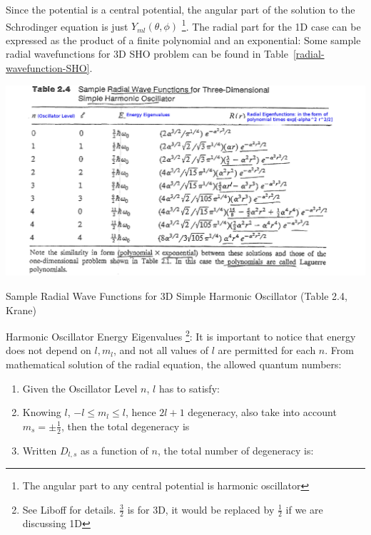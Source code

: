 \documentclass{school-22.101-notes}
\begin{document}
Since the potential is a central potential, the angular part of the solution to the Schrodinger equation is just $Y_{ml} (\theta, \phi)$ \footnote{The angular part to any central potential is harmonic oscillator}. The radial part for the 1D case can be expressed as the product of a finite polynomial and an exponential: 
Some sample radial wavefunctions for 3D SHO problem can be found in Table~\ref{radial-wavefunction-SHO}. 

\begin{table}[h!]
    \centering
    \includegraphics[width=6in]{images/shell/radial-wavefunction-SHO.png}
    \caption{Sample Radial Wave Functions for 3D Simple Harmonic Oscillator (Table 2.4, Krane)}
    \label{radial-wavefunction-SHO}
\end{table}

Harmonic Oscillator Energy Eigenvalues \footnote{See Liboff for details. $\frac{3}{2}$ is for 3D, it would be replaced by $\frac{1}{2}$ if we are discussing 1D}: 
It is important to notice that energy does not depend on $l, m_l$, and not all values of $l$ are permitted for each $n$. From mathematical solution of the radial equation, the allowed quantum numbers: 
\begin{enumerate}
\item Given the Oscillator Level $n$, $l$ has to satisfy:
\item Knowing $l$, $-l \le m_l \le l$, hence $2l+1$ degeneracy, also take into account $m_s = \pm \frac{1}{2}$, then the total degeneracy is 
\item Written $D_{l,s}$ as a function of $n$, the total number of degeneracy is: 
\end{enumerate}
\end{document}
